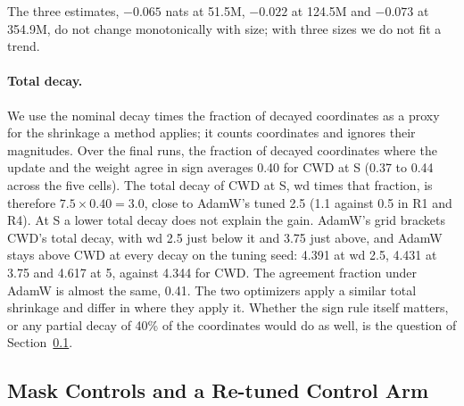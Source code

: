 \documentclass[twoside,11pt]{article}
\begin{document}
\begin{table}[t]
\centering
\footnotesize
\resizebox{\textwidth}{!}{}
\caption{Protocol P5: CWD against AdamW at 354.9M parameters in arm R16, six final seeds (3001--3006). Agreement is the mean fraction of decayed coordinates where update and weight agree in sign; total decay is wd times that fraction for CWD and wd for AdamW. Norms are over the decayed weights at the end of training. The last column gives the best validation loss on the tuning seed at each decay, including the points added by P5x.}
\label{tab:p5}
\end{table}

The three estimates, $-0.065$ nats at 51.5M, $-0.022$ at 124.5M and $-0.073$ at 354.9M, do not change monotonically with size; with three sizes we do not fit a trend.

\paragraph{Total decay.} We use the nominal decay times the fraction of decayed coordinates as a proxy for the shrinkage a method applies; it counts coordinates and ignores their magnitudes. Over the final runs, the fraction of decayed coordinates where the update and the weight agree in sign averages 0.40 for CWD at S (0.37 to 0.44 across the five cells). The total decay of CWD at S, wd times that fraction, is therefore $7.5 \times 0.40 = 3.0$, close to AdamW's tuned 2.5 (1.1 against 0.5 in R1 and R4). At S a lower total decay does not explain the gain. AdamW's grid brackets CWD's total decay, with wd 2.5 just below it and 3.75 just above, and AdamW stays above CWD at every decay on the tuning seed: 4.391 at wd 2.5, 4.431 at 3.75 and 4.617 at 5, against 4.344 for CWD. The agreement fraction under AdamW is almost the same, 0.41. The two optimizers apply a similar total shrinkage and differ in where they apply it. Whether the sign rule itself matters, or any partial decay of 40\% of the coordinates would do as well, is the question of Section~\ref{sec:p3}.

\subsection{Mask Controls and a Re-tuned Control Arm}
\label{sec:p3}
\end{document}
